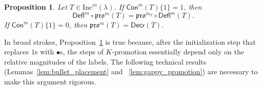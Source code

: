 \documentclass[12pt]{amsart}
\newtheorem{proposition}[theorem]{Proposition}
\theoremstyle{definition}
\theoremstyle{remark}
\numberwithin{equation}{section}
\newcommand{\inc}{\ensuremath{\mathrm{Inc}}}
\newcommand{\pro}{\mathfrak{pro}}
\newcommand{\decr}{\ensuremath{\mathsf{Decr}}}
\newcommand{\deflate}{\ensuremath{\mathsf{Defl}}}
\newcommand{\content}{\ensuremath{\mathsf{Con}}}
\begin{document}
\begin{proposition}\label{prop:deflation_commutation}
Let $T \in \inc^m(\lambda)$. If $\content^m(T) \lbrace 1 \rbrace = 1$, then
\begin{equation}\label{eq:deflation_commutation}
\deflate^m \circ \pro^m(T) = \pro^{m_T} \circ \deflate^m(T).
\end{equation}
If $\content^m(T) \lbrace 1 \rbrace = 0$, then $\pro^m(T) = \decr(T)$. 
\end{proposition} 
In broad strokes, Proposition~\ref{prop:deflation_commutation} is true because, after the initialization step that replaces $1$s with $\bullet$s, the steps of $K$-promotion essentially depend only on the relative magnitudes of the labels. The following technical results (Lemmas~\ref{lem:bullet_placement} and ~\ref{lem:gappy_promotion}) are necessary to make this argument rigorous. 
\end{document}
